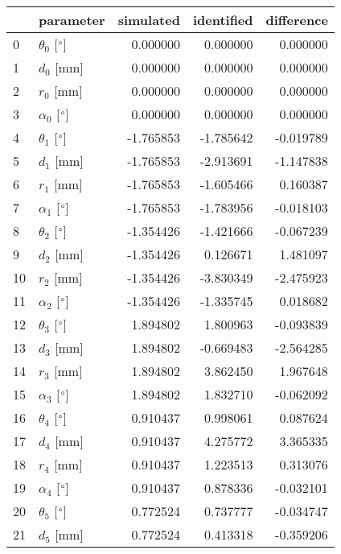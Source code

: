 \documentclass{standalone}%
\begin{document}
%
\normalsize%
\begin{tabular}{llrrr}
\toprule
{} &                 parameter & simulated & identified & difference \\
\midrule
0  &  $\theta_{0}$ [$\degree$] &  0.000000 &   0.000000 &   0.000000 \\
1  &              $d_{0}$ [mm] &  0.000000 &   0.000000 &   0.000000 \\
2  &              $r_{0}$ [mm] &  0.000000 &   0.000000 &   0.000000 \\
3  &  $\alpha_{0}$ [$\degree$] &  0.000000 &   0.000000 &   0.000000 \\
4  &  $\theta_{1}$ [$\degree$] & -1.765853 &  -1.785642 &  -0.019789 \\
5  &              $d_{1}$ [mm] & -1.765853 &  -2.913691 &  -1.147838 \\
6  &              $r_{1}$ [mm] & -1.765853 &  -1.605466 &   0.160387 \\
7  &  $\alpha_{1}$ [$\degree$] & -1.765853 &  -1.783956 &  -0.018103 \\
8  &  $\theta_{2}$ [$\degree$] & -1.354426 &  -1.421666 &  -0.067239 \\
9  &              $d_{2}$ [mm] & -1.354426 &   0.126671 &   1.481097 \\
10 &              $r_{2}$ [mm] & -1.354426 &  -3.830349 &  -2.475923 \\
11 &  $\alpha_{2}$ [$\degree$] & -1.354426 &  -1.335745 &   0.018682 \\
12 &  $\theta_{3}$ [$\degree$] &  1.894802 &   1.800963 &  -0.093839 \\
13 &              $d_{3}$ [mm] &  1.894802 &  -0.669483 &  -2.564285 \\
14 &              $r_{3}$ [mm] &  1.894802 &   3.862450 &   1.967648 \\
15 &  $\alpha_{3}$ [$\degree$] &  1.894802 &   1.832710 &  -0.062092 \\
16 &  $\theta_{4}$ [$\degree$] &  0.910437 &   0.998061 &   0.087624 \\
17 &              $d_{4}$ [mm] &  0.910437 &   4.275772 &   3.365335 \\
18 &              $r_{4}$ [mm] &  0.910437 &   1.223513 &   0.313076 \\
19 &  $\alpha_{4}$ [$\degree$] &  0.910437 &   0.878336 &  -0.032101 \\
20 &  $\theta_{5}$ [$\degree$] &  0.772524 &   0.737777 &  -0.034747 \\
21 &              $d_{5}$ [mm] &  0.772524 &   0.413318 &  -0.359206 \\

\end{tabular}
\end{document}
